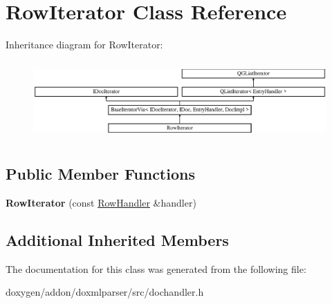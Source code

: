 \hypertarget{class_row_iterator}{}\section{Row\+Iterator Class Reference}
\label{class_row_iterator}
Inheritance diagram for Row\+Iterator\+:\begin{figure}[H]
\begin{center}
\leavevmode
\includegraphics[height=3.027027cm]{class_row_iterator}
\end{center}
\end{figure}
\subsection*{Public Member Functions}
\begin{DoxyCompactItemize}
\item 
\mbox{\label{class_row_iterator_aec4f172f8c414961de0f3474c23bc253}} 
{\bfseries Row\+Iterator} (const \mbox{\hyperlink{class_row_handler}{Row\+Handler}} \&handler)
\end{DoxyCompactItemize}
\subsection*{Additional Inherited Members}


The documentation for this class was generated from the following file\+:\begin{DoxyCompactItemize}
\item 
doxygen/addon/doxmlparser/src/dochandler.\+h\end{DoxyCompactItemize}
